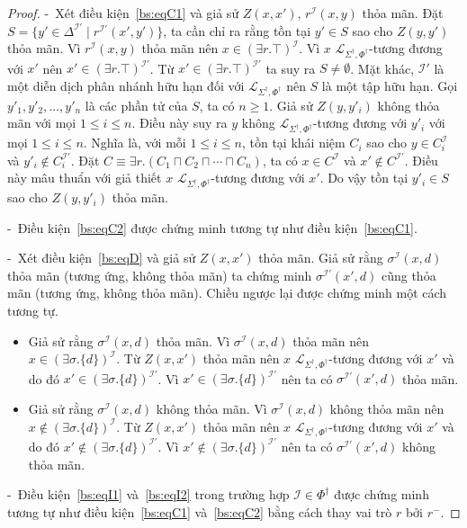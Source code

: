 \documentclass[12pt,a4paper,twoside]{report}
\newcommand{\mL}		{\mathcal{L}}
\newcommand{\mI}		{\mathcal{I}}
\newcommand{\PhiDag}	{\Phi^\dag}
\newcommand{\mLSPD}		{\mL_{\Sigma^\dag,\Phi^\dag}}
\newcommand{\semiItem}	{\mbox{- }}
\newcommand{\mand}		{\sqcap}
\newcommand{\E}			{\exists}
\theoremstyle{definition}
\begin{document}
\begin{proof}
\semiItem Xét điều kiện~\eqref{bs:eqC1} và giả sử $Z(x,x')$, $r^\mI(x,y)$ thỏa mãn. Đặt $S = \{y' \in \Delta^{\mI'} \mid r^{\mI'}(x',y')\}$, ta cần chỉ ra rằng tồn tại $y' \in S$ sao cho $Z(y,y')$ thỏa mãn. Vì $r^\mI(x,y)$ thỏa mãn nên $x \in (\E r.\top)^\mI$. Vì $x$ $\mLSPD$-tương đương với $x'$ nên $x' \in (\E r.\top)^{\mI'}$. Từ $x' \in (\E r.\top)^{\mI'}$ ta suy ra $S \not= \emptyset$. Mặt khác, $\mI'$ là một diễn dịch phân nhánh hữu hạn đối với $\mLSPD$ nên $S$ là một tập hữu hạn. Gọi $y'_1, y'_2, \ldots, y'_n$ là các phần tử của $S$, ta có $n \geq 1$.
Giả sử $Z(y,y'_i)$ không thỏa mãn với mọi $1 \leq i \leq n$. Điều này suy ra $y$ không $\mLSPD$-tương đương với $y'_i$ với mọi $1 \leq i \leq n$. Nghĩa là, với mỗi $1 \leq i \leq n$, tồn tại khái niệm $C_i$ sao cho $y \in C_i^\mI$ và $y'_i \not\in C_i^{\mI'}$. Đặt $C \equiv \E r.(C_1 \mand C_2 \mand \cdots \mand C_n)$, ta có $x \in C^\mI$ và $x' \not\in C^{\mI'}$. Điều này mâu thuẩn với giả thiết $x$ $\mLSPD$-tương đương với $x'$. Do vậy tồn tại $y'_i \in S$ sao cho $Z(y, y'_i)$ thỏa mãn.

\semiItem Điều kiện~\eqref{bs:eqC2} được chứng minh tương tự như điều kiện~\eqref{bs:eqC1}.

\semiItem Xét điều kiện~\eqref{bs:eqD} và giả sử $Z(x,x')$ thỏa mãn. Giả sử rằng $\sigma^\mI(x,d)$ thỏa mãn (tương ứng, không thỏa mãn) ta chứng minh $\sigma^{\mI'}(x',d)$ cũng thỏa mãn (tương ứng, không thỏa mãn). Chiều ngược lại được chứng minh một cách tương tự.
\begin{itemize}
  \item Giả sử rằng $\sigma^\mI(x,d)$ thỏa mãn. Vì $\sigma^\mI(x,d)$ thỏa mãn nên $x \in (\E \sigma.\{d\})^\mI$. Từ $Z(x,x')$ thỏa mãn nên $x$ $\mLSPD$-tương đương với $x'$ và do đó $x' \in (\E \sigma.\{d\})^{\mI'}$. Vì $x' \in (\E \sigma.\{d\})^{\mI'}$ nên ta có $\sigma^{\mI'}(x',d)$ thỏa mãn.

  \item Giả sử rằng $\sigma^\mI(x,d)$ không thỏa mãn. Vì $\sigma^\mI(x,d)$ không thỏa mãn nên $x \not\in (\E \sigma.\{d\})^\mI$. Từ $Z(x,x')$ thỏa mãn nên $x$ $\mLSPD$-tương đương với $x'$ và do đó $x' \not\in (\E \sigma.\{d\})^{\mI'}$. Vì $x' \not\in (\E \sigma.\{d\})^{\mI'}$ nên ta có $\sigma^{\mI'}(x',d)$ không thỏa mãn.
\end{itemize}

\semiItem Điều kiện~\eqref{bs:eqI1} và~\eqref{bs:eqI2} trong trường hợp $\mI \in \PhiDag$ được chứng minh tương tự như điều kiện~\eqref{bs:eqC1} và~\eqref{bs:eqC2} bằng cách thay vai trò $r$ bởi $r^-$.


\end{proof}
\end{document}
